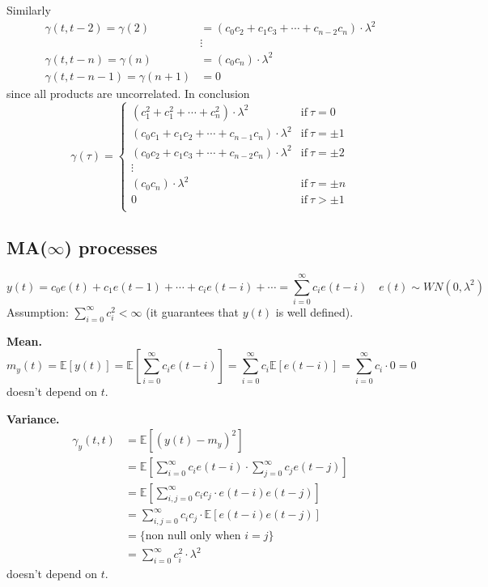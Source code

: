Similarly
\begin{align*}
	\gamma (t,t-2)=\gamma (2) &= (c_{0}c_{2}+c_{1}c_{3}+\cdots+c_{n-2}c_{n})\cdot\lambda^2\\
	&\vdots\\
	\gamma (t,t-n)=\gamma (n) &= (c_{0}c_{n})\cdot\lambda^2\\
	\gamma (t,t-n-1)=\gamma (n+1) &= 0
\end{align*}
since all products are uncorrelated. In conclusion
\[
	\gamma (\tau )=\begin{cases}
		(c_{1}^2 +c_{1}^2 +\cdots+c_{n}^2 )\cdot\lambda^2 & \text{if}\ \tau =0\\
		(c_{0}c_{1}+c_{1}c_{2}+\cdots+c_{n-1}c_{n})\cdot\lambda^2 & \text{if}\ \tau =\pm 1\\
		(c_{0}c_{2}+c_{1}c_{3}+\cdots+c_{n-2}c_{n})\cdot\lambda^2 & \text{if}\ \tau =\pm 2\\
		\vdots\\
		(c_{0}c_{n})\cdot\lambda^2 & \text{if}\ \tau =\pm n\\
		0 & \text{if}\ \tau > \pm 1\\
	\end{cases}
\]
\subsection{MA(\texorpdfstring{$\infty$}{infinity}) processes}

\[
	y(t)=c_{0} e(t)+c_{1} e(t-1)+\cdots+c_{i} e(t-i)+\cdots=\sum_{i=0}^{\infty} c_{i} e(t-i) \quad e(t) \sim W N\left(0, \lambda^{2}\right)
\]
Assumption: $\sum_{i=0}^{\infty} c_{i}^{2}<\infty$ (it guarantees that $y(t)$ is well defined).

\textbf{Mean.}
\[
	m_{y}(t)=\mathbb{E}[y(t)]=\mathbb{E}\left[\sum_{i=0}^{\infty} c_{i} e(t-i)\right]=\sum_{i=0}^{\infty} c_{i} \mathbb{E}[e(t-i)]=\sum_{i=0}^{\infty} c_{i} \cdot 0=0
\]
doesn't depend on $t$.

\textbf{Variance.}
\begin{align*}
	\gamma_{y}(t, t)&=\mathbb{E}[(y(t)-m_{y})^{2}]\\
	&=\mathbb{E}\left[\sum_{i=0}^{\infty} c_{i} e(t-i) \cdot \sum_{j=0}^{\infty} c_{j} e(t-j)\right]\\
	&=\mathbb{E}\left[\sum_{i, j=0}^{\infty} c_{i} c_{j} \cdot e(t-i) e(t-j)\right]\\
	&=\sum_{i, j=0}^{\infty} c_{i} c_{j} \cdot \mathbb{E}[e(t-i) e(t-j)]\\
	&=\{\text{non null only when }i=j\}\\
	&=\sum_{i=0}^{\infty} c_{i}^2 \cdot\lambda^2 
\end{align*}
doesn't depend on $t$.

